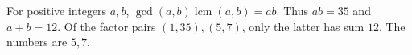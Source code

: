 For positive integers $a,b$, $\gcd(a,b)\operatorname{lcm}(a,b)=ab$. Thus $ab=35$ and $a+b=12$. Of the factor pairs $(1,35),(5,7)$, only the latter has sum $12$. The numbers are $\boxed{5,7}$.
